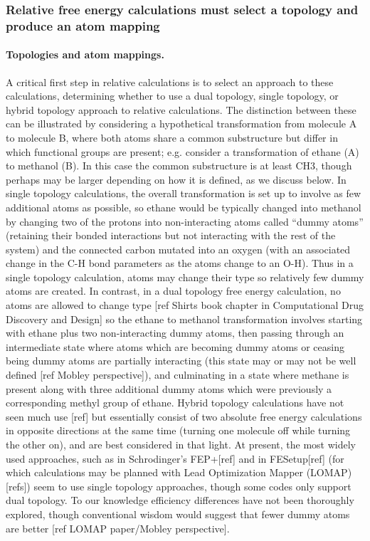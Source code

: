 \documentclass[9pt,bestpractices]{livecoms}
\begin{document}
\subsubsection{Relative free energy calculations must select a topology and produce an atom mapping}

\paragraph{Topologies and atom mappings.} A critical first step in relative calculations is to select an approach to these calculations, determining whether to use a dual topology, single topology, or hybrid topology approach to relative calculations.
The distinction between these can be illustrated by considering a hypothetical transformation from molecule A to molecule B, where both atoms share a common substructure but differ in which functional groups are present; e.g. consider a transformation of ethane (A) to methanol (B).
In this case the common substructure is at least CH3, though perhaps may be larger depending on how it is defined, as we discuss below.
In single topology calculations, the overall transformation is set up to involve as few additional atoms as possible, so ethane would be typically changed into methanol by changing two of the protons into non-interacting atoms called ``dummy atoms'' (retaining their bonded interactions but not interacting with the rest of the system) and the connected carbon mutated into an oxygen (with an associated change in the C-H bond parameters as the atoms change to an O-H).
Thus in a single topology calculation, atoms may change their type so relatively few dummy atoms are created.
In contrast, in a dual topology free energy calculation, no atoms are allowed to change type [ref Shirts book chapter in Computational Drug Discovery and Design] so the ethane to methanol transformation involves starting with ethane plus two non-interacting dummy atoms, then passing through an intermediate state where atoms which are becoming dummy atoms or ceasing being dummy atoms are partially interacting (this state may or may not be well defined [ref Mobley perspective]), and culminating in a state where methane is present along with three additional dummy atoms which were previously a corresponding methyl group of ethane.
Hybrid topology calculations have not seen much use [ref] but essentially consist of two absolute free energy calculations in opposite directions at the same time (turning one molecule off while turning the other on), and are best considered in that light.
At present, the most widely used approaches, such as in Schrodinger's FEP+[ref] and in FESetup[ref] (for which calculations may be planned with Lead Optimization Mapper (LOMAP) [refs]) seem to use single topology approaches, though some codes only support dual topology.
To our knowledge efficiency differences have not been thoroughly explored, though conventional wisdom would suggest that fewer dummy atoms are better [ref LOMAP paper/Mobley perspective].
\end{document}
